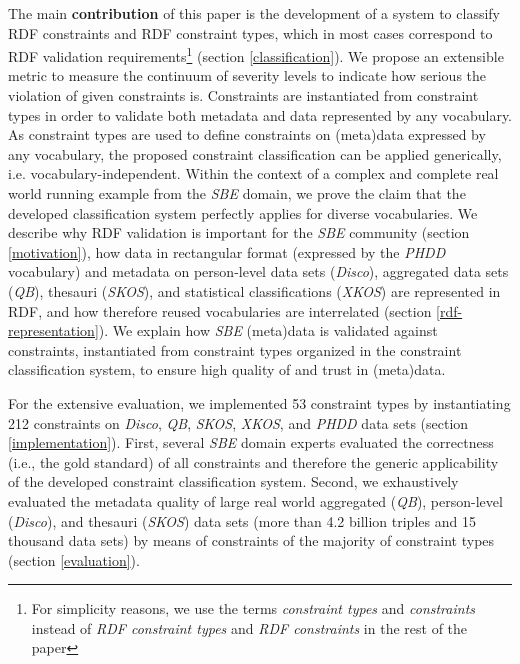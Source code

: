 \documentclass{llncs}
\begin{document}
The main \textbf{contribution} of this paper is the development of a system to classify RDF constraints and RDF constraint types, which in most cases correspond to RDF validation requirements\footnote{For simplicity reasons, we use the terms \emph{constraint types} and \emph{constraints} instead of \emph{RDF constraint types} and \emph{RDF constraints} in the rest of the paper} (section \ref{classification}).
We propose an extensible metric to measure the continuum of severity levels to indicate how serious the violation of given constraints is.
Constraints are instantiated from constraint types in order to validate both metadata and data represented by any vocabulary. 
As constraint types are used to define constraints on (meta)data expressed by any vocabulary, the proposed constraint classification can be applied generically, i.e. vocabulary-independent. 
Within the context of a complex and complete real world running example from the \emph{SBE} domain, we prove the claim that the developed classification system perfectly applies for diverse vocabularies.
We describe why RDF validation is important for the \emph{SBE} community (section \ref{motivation}), 
how data in rectangular format (expressed by the \emph{PHDD} vocabulary) and metadata on person-level data sets (\emph{Disco}), aggregated data sets (\emph{QB}), thesauri (\emph{SKOS}), and statistical classifications (\emph{XKOS}) are represented in RDF, and how therefore reused vocabularies are interrelated (section \ref{rdf-representation}).
We explain how \emph{SBE} (meta)data is validated against constraints, instantiated from constraint types organized in the constraint classification system, to ensure high quality of and trust in (meta)data.

For the extensive evaluation, we implemented 53 constraint types by instantiating 212 constraints on \emph{Disco}, \emph{QB}, \emph{SKOS}, \emph{XKOS}, and \emph{PHDD} data sets (section \ref{implementation}).
First, several \emph{SBE} domain experts evaluated the correctness (i.e., the gold standard) of all constraints and therefore the generic applicability of the developed constraint classification system. 
Second, we exhaustively evaluated the metadata quality of large real world aggregated (\emph{QB}), person-level (\emph{Disco}), and thesauri (\emph{SKOS}) data sets (more than 4.2 billion triples and 15 thousand data sets) by means of constraints of the majority of constraint types (section \ref{evaluation}).
\end{document}
